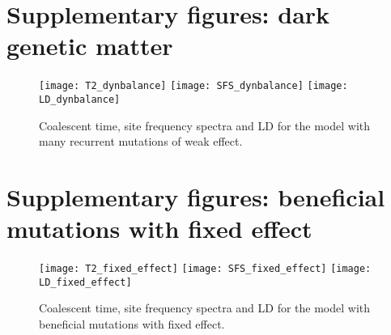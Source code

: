 

\section*{Supplementary figures: dark genetic matter}

\begin{figure}[h]
  \centering
  \texttt{[image: T2\_dynbalance]}
  \texttt{[image: SFS\_dynbalance]}
  \texttt{[image: LD\_dynbalance]}
  \caption{Coalescent time, site frequency spectra and LD for the model with many recurrent mutations of weak effect.}
  \label{fig:dark_matter_suppfig}
\end{figure}

\clearpage
\section*{Supplementary figures: beneficial mutations with fixed effect}

\begin{figure}[h]
  \centering
  \texttt{[image: T2\_fixed\_effect]}
  \texttt{[image: SFS\_fixed\_effect]}
  \texttt{[image: LD\_fixed\_effect]}
  \caption{Coalescent time, site frequency spectra and LD for the model
    with beneficial mutations with fixed effect.}
  \label{fig:dark_matter_suppfig}
\end{figure}